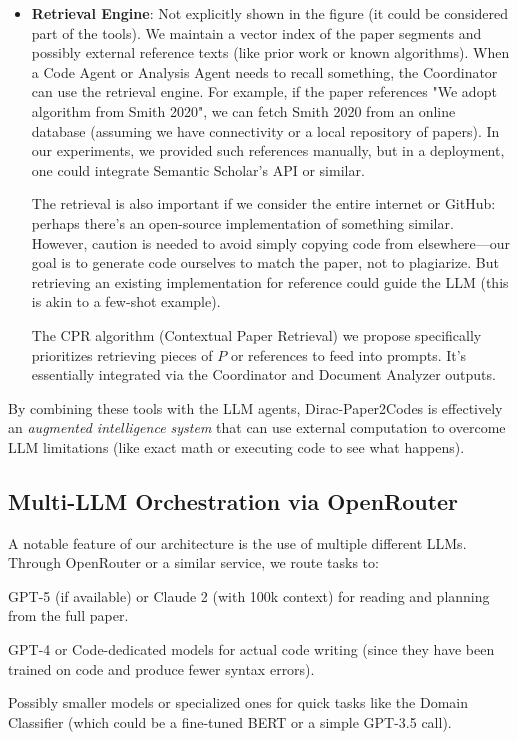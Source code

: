 \documentclass{ieeeaccess}
\begin{document}
\begin{itemize}
\item \textbf{Retrieval Engine}: Not explicitly shown in the figure (it could be considered part of the tools). We maintain a vector index of the paper segments and possibly external reference texts (like prior work or known algorithms). When a Code Agent or Analysis Agent needs to recall something, the Coordinator can use the retrieval engine. For example, if the paper references "We adopt algorithm from Smith 2020", we can fetch Smith 2020 from an online database (assuming we have connectivity or a local repository of papers). In our experiments, we provided such references manually, but in a deployment, one could integrate Semantic Scholar's API or similar.

The retrieval is also important if we consider the entire internet or GitHub: perhaps there's an open-source implementation of something similar. However, caution is needed to avoid simply copying code from elsewhere---our goal is to generate code ourselves to match the paper, not to plagiarize. But retrieving an existing implementation for reference could guide the LLM (this is akin to a few-shot example).

The CPR algorithm (Contextual Paper Retrieval) we propose specifically prioritizes retrieving pieces of $P$ or references to feed into prompts. It's essentially integrated via the Coordinator and Document Analyzer outputs.


\end{itemize}

By combining these tools with the LLM agents, Dirac-Paper2Codes is effectively an \emph{augmented intelligence system} that can use external computation to overcome LLM limitations (like exact math or executing code to see what happens).

\subsection{Multi-LLM Orchestration via OpenRouter}
A notable feature of our architecture is the use of multiple different LLMs. Through OpenRouter or a similar service, we route tasks to:

GPT-5 (if available) or Claude 2 (with 100k context) for reading and planning from the full paper.

GPT-4 or Code-dedicated models for actual code writing (since they have been trained on code and produce fewer syntax errors).

Possibly smaller models or specialized ones for quick tasks like the Domain Classifier (which could be a fine-tuned BERT or a simple GPT-3.5 call).
\end{document}
